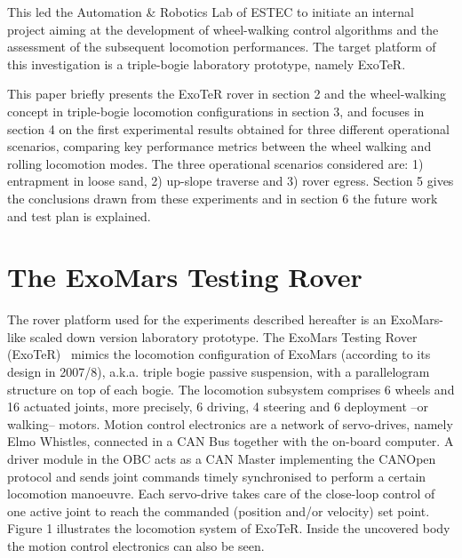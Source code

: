 \documentclass[a4paper,twocolumn]{esapub2005} %
\begin{document}
This led the Automation \& Robotics Lab of ESTEC to initiate an internal project aiming at the development of wheel-walking control algorithms and the assessment of the subsequent locomotion performances. The target platform of this investigation is a triple-bogie laboratory prototype, namely ExoTeR.

This paper briefly presents the ExoTeR rover in section 2 and the wheel-walking concept in triple-bogie locomotion configurations in section 3, and focuses in section 4 on the first experimental results obtained for three different operational scenarios, comparing key performance metrics between the wheel walking and rolling locomotion modes. The three operational scenarios considered are: 1) entrapment in loose sand, 2) up-slope traverse and 3) rover egress. Section 5 gives the conclusions drawn from these experiments and in section 6 the future work and test plan is explained.

\section{The ExoMars Testing Rover}

The rover platform used for the experiments described hereafter is an ExoMars-like scaled down version laboratory prototype. The ExoMars Testing Rover (ExoTeR)~\cite{Azkarate2015} mimics the locomotion configuration of ExoMars (according to its design in 2007/8), a.k.a. triple bogie passive suspension, with a parallelogram structure on top of each bogie. The locomotion subsystem comprises 6 wheels and 16 actuated joints, more precisely, 6 driving, 4 steering and 6 deployment –or walking– motors. 
Motion control electronics are a network of servo-drives, namely Elmo Whistles, connected in a CAN Bus together with the on-board computer. A driver module in the OBC acts as a CAN Master implementing the CANOpen protocol and sends joint commands timely synchronised to perform a certain locomotion manoeuvre. Each servo-drive takes care of the close-loop control of one active joint to reach the commanded (position and/or velocity) set point. 
Figure 1 illustrates the locomotion system of ExoTeR. Inside the uncovered body the motion control electronics can also be seen.
\end{document}
